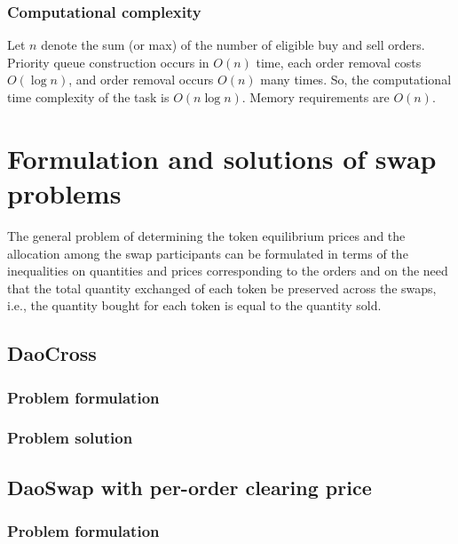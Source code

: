 \documentclass[11pt, reqno]{amsart}
\theoremstyle{definition}
\theoremstyle{remark}
\begin{document}
\subsubsection{Computational complexity}
Let $n$ denote the sum (or max) of the number of eligible buy and sell orders.
Priority queue construction occurs in $O(n)$ time, each order removal costs
$O(\log n)$, and order removal occurs $O(n)$ many times. So, the computational
time complexity of the task is $O(n \log n)$. Memory requirements are $O(n)$.

\section{Formulation and solutions of swap problems}
The general problem of determining the token equilibrium prices and the
allocation among the swap participants can be formulated in terms of the
inequalities on quantities and prices corresponding to the orders and on the
need that the total quantity exchanged of each token be preserved across the
swaps, i.e., the quantity bought for each token is equal to the quantity sold.

\subsection{DaoCross}

\subsubsection{Problem formulation}

\subsubsection{Problem solution}

\subsection{DaoSwap with per-order clearing price}

\subsubsection{Problem formulation}
\end{document}

